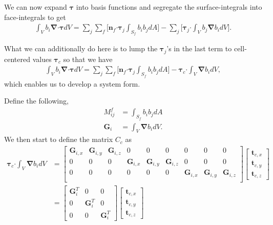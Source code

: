 \documentclass[10pt,letterpaper,notitlepage]{article}
\numberwithin{equation}{section}
\newcommand{\bnabla}{\boldsymbol{\nabla}}
\newcommand{\dotp}{\boldsymbol{\cdot}}
\newcommand{\beq}{\begin{equation*} \begin{aligned}}
\newcommand{\eeq}{\end{aligned}\end{equation*}}
\newcommand{\beqn}{\begin{equation}\begin{aligned}}
\newcommand{\eeqn}{\end{aligned}\end{equation}}
\begin{document}
\begin{appendices}
We can now expand $\boldsymbol{\tau}$ into basis functions and segregate the surface-integrals into face-integrals to get
\beqn 
\int_V b_i \bnabla \dotp \boldsymbol{\tau} dV =
\sum_j \sum_f \biggr[
\mathbf{n}_f \dotp \boldsymbol{\tau}_j \int_{S_f} b_i b_j dA 
\biggr]- 
\sum_j \biggr[
\boldsymbol{\tau}_j \dotp \int_V b_j \bnabla b_i dV
\biggr].
\eeqn 

What we can additionally do here is to lump the $\boldsymbol{\tau}_j$'s in the last term to cell-centered values $\boldsymbol{\tau}_c$ so that we have
\beqn 
\int_V b_i \bnabla \dotp \boldsymbol{\tau} dV =
\sum_j \sum_f \biggr[
\mathbf{n}_f \dotp \boldsymbol{\tau}_j \int_{S_f} b_i b_j dA 
\biggr]- 
\boldsymbol{\tau}_c \dotp \int_V \bnabla b_i dV,
\eeqn 
which enables us to develop a system form.

Define the following,
\beq
M_{ij}^f &=  \int_{S_f} b_i b_j dA \\
\mathbf{G}_i &= \int_V \bnabla b_i dV.
\eeq
We then start to define the matrix $C_c$ as
\beqn 
\boldsymbol{\tau}_c \dotp \int_V \bnabla b_i dV
&=
\begin{bmatrix}
	\mathbf{G}_{i,x} & \mathbf{G}_{i,y} & \mathbf{G}_{i,z} & 0 & 0 & 0 & 0 & 0 & 0\\
	0 & 0 & 0 & \mathbf{G}_{i,x} & \mathbf{G}_{i,y} & \mathbf{G}_{i,z} & 0 & 0 & 0 \\
	0 & 0 & 0 & 0 & 0 & 0 & \mathbf{G}_{i,x} & \mathbf{G}_{i,y} & \mathbf{G}_{i,z} \\
\end{bmatrix}
\begin{bmatrix}
	\mathbf{t}_{c,x} \\ 	\mathbf{t}_{c,y} \\	\mathbf{t}_{c,z}
\end{bmatrix}
\\
&=
\begin{bmatrix}
	\mathbf{G}_i^T & 0 & 0\\
	0 & \mathbf{G}_i^T & 0 \\
	0 & 0 & \mathbf{G}_i^T
\end{bmatrix}
\begin{bmatrix}
	\mathbf{t}_{c,x} \\ 	\mathbf{t}_{c,y} \\	\mathbf{t}_{c,z}
\end{bmatrix}
\eeqn 







\end{appendices}
\end{document}
